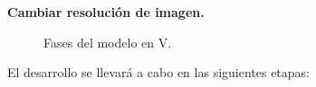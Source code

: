 \TODO \textbf{Cambiar resolución de imagen.}
\begin{figure}[htbp!]
	\centering
	\caption{Fases del modelo en V.}
	\label{fig:IntroduccionMetodologia}
\end{figure}

El desarrollo se llevará a cabo en las siguientes etapas:

